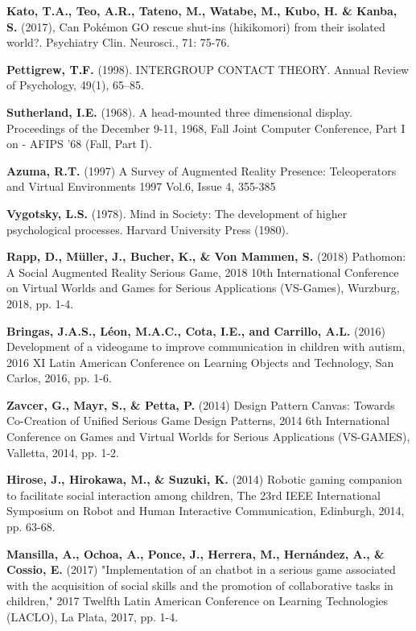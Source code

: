 \documentclass[runningheads]{llncs}
\begin{document}
\begin{thebibliography}{8}
 \textbf{Kato, T.A., Teo, A.R., Tateno, M., Watabe, M., Kubo, H. \& Kanba, S.} (2017), Can Pokémon GO rescue shut-ins (hikikomori) from their isolated world?. Psychiatry Clin. Neurosci., 71: 75-76. 

 \textbf{Pettigrew, T.F.} (1998). INTERGROUP CONTACT THEORY. Annual Review of Psychology, 49(1), 65–85. 

 \textbf{Sutherland, I.E.} (1968). A head-mounted three dimensional display. Proceedings of the December 9-11, 1968, Fall Joint Computer Conference, Part I on - AFIPS ’68 (Fall, Part I). 

 \textbf{Azuma, R.T.} (1997) A Survey of Augmented Reality
Presence: Teleoperators and Virtual Environments 1997 Vol.6, Issue 4, 355-385 

 \textbf{Vygotsky,  L.S.} (1978).  Mind in Society: The development of higher  psychological  processes.  Harvard University Press (1980). 

 \textbf{Rapp, D., Müller, J., Bucher, K., \& Von Mammen, S.} (2018) Pathomon: A Social Augmented Reality Serious Game, 2018 10th International Conference on Virtual Worlds and Games for Serious Applications (VS-Games), Wurzburg, 2018, pp. 1-4. 

 \textbf{Bringas, J.A.S., Léon, M.A.C., Cota, I.E., and Carrillo, A.L.} (2016) Development of a videogame to improve communication in children with autism, 2016 XI Latin American Conference on Learning Objects and Technology, San Carlos, 2016, pp. 1-6. 

 \textbf{Zavcer, G., Mayr, S., \& Petta, P.} (2014) Design Pattern Canvas: Towards Co-Creation of Unified Serious Game Design Patterns, 2014 6th International Conference on Games and Virtual Worlds for Serious Applications (VS-GAMES), Valletta, 2014, pp. 1-2.

 \textbf{Hirose, J., Hirokawa, M., \& Suzuki, K.} (2014) Robotic gaming companion to facilitate social interaction among children, The 23rd IEEE International Symposium on Robot and Human Interactive Communication, Edinburgh, 2014, pp. 63-68. 

 \textbf{Mansilla, A., Ochoa, A., Ponce, J., Herrera, M., Hernández, A., \& Cossio, E.} (2017) "Implementation of an chatbot in a serious game associated with the acquisition of social skills and the promotion of collaborative tasks in children," 2017 Twelfth Latin American Conference on Learning Technologies (LACLO), La Plata, 2017, pp. 1-4.


\end{thebibliography}
\end{document}
